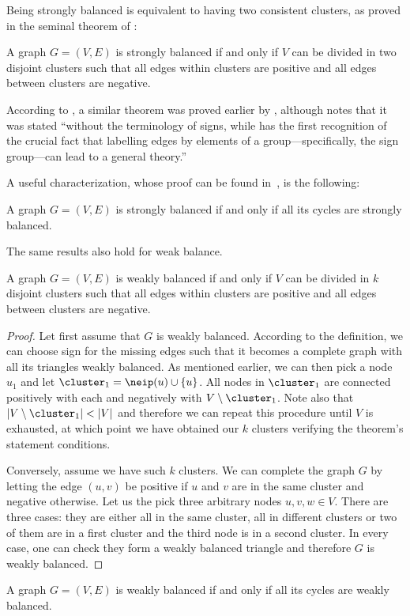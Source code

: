 Being strongly balanced is equivalent to having two consistent clusters, as proved in the seminal
theorem of \textcite[Theorem 3]{harary1953}:
\begin{theorem}
  A graph $G=(V,E)$ is strongly balanced if and only if $V$ can be divided in two disjoint clusters
  such that all edges within clusters are positive and all edges between clusters are negative.
\end{theorem}

According to \textcite{Huffner2010}, a similar theorem was proved earlier by \textcite[Theorem
X.11]{Konig36}, although \textcite{Zaslavsky2012} notes that it was stated \enquote{without the
terminology of signs, while \autocite{harary1953} has the first recognition of the crucial fact that
labelling edges by elements of a group---specifically, the sign group---can lead to a general
theory.}

A useful characterization, whose proof can be found in~\autocite[page 122]{BookKleinberg2010}, is the
following:
\begin{theorem}
  A graph $G=(V,E)$ is strongly balanced if and only if all its cycles are strongly balanced.
\end{theorem}

The same results also hold for weak balance.
\begin{theorem}
  A graph $G=(V,E)$ is weakly balanced if and only if $V$ can be divided in $k$ disjoint clusters
  such that all edges within clusters are positive and all edges between clusters are negative.
\end{theorem}
\begin{proof}
  Let first assume that $G$ is weakly balanced. According to the definition, we can choose sign for
  the missing edges such that it becomes a complete graph with all its triangles weakly balanced. As
  mentioned earlier, we can then pick a node $u_1$ and let $\cluster_1 = \neip(u) \cup \{u\}$. All
  nodes in $\cluster_1$ are connected positively with each and negatively with $V\setminus
  \cluster_1$. Note also that $|V\setminus \cluster_1| < |V|$ and therefore we can repeat this
  procedure until $V$ is exhausted, at which point we have obtained our $k$ clusters verifying the
  theorem's statement conditions.

  Conversely, assume we have such $k$ clusters. We can complete the graph $G$ by letting the edge
  $(u,v)$ be positive if $u$ and $v$ are in the same cluster and negative otherwise. Let us the pick
  three arbitrary nodes $u,v,w\in V$. There are three cases: they are either all in the same
  cluster, all in different clusters or two of them are in a first cluster and the third node is in
  a second cluster. In every case, one can check they form a weakly balanced triangle and therefore
  $G$ is weakly balanced.
\end{proof}
\begin{theorem}
  A graph $G=(V,E)$ is weakly balanced if and only if all its cycles are weakly balanced.
\end{theorem}

